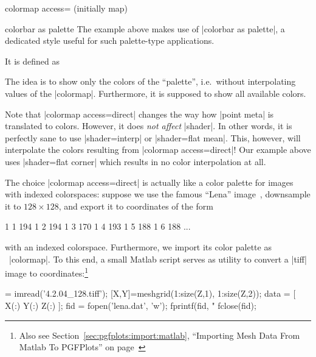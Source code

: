 \begin{pgfplotskey}{colormap access= (initially map)}
\begin{pgfplotskey}{colorbar as palette}
	The example above makes use of |colorbar as palette|, a dedicated style useful for such palette-type applications.

	It is defined as
\begin{codeexample}
\end{codeexample}
	The idea is to show only the colors of the ``palette'', i.e.\ without interpolating values of the |colormap|. Furthermore, it is supposed to show all available colors.
\end{pgfplotskey}

	Note that |colormap access=direct| changes the way how |point meta| is translated to colors. However, it does \emph{not affect} |shader|. In other words, it is perfectly sane to use |shader=interp| or |shader=flat mean|. This, however, will interpolate the colors resulting from |colormap access=direct|! Our example above uses |shader=flat corner| which results in no color interpolation at all.

	The choice |colormap access=direct| is actually like a color palette for images with indexed colorspaces: suppose we use the famous ``Lena'' image~\cite{lena}, downsample it to $128\times 128$, and export it to coordinates of the form
\begin{codeexample}
1 1 194
1 2 194
1 3 170
1 4 193
1 5 188
1 6 188
...
\end{codeexample}
	with an indexed colorspace. Furthermore, we import its color palette as \PGFPlots\ |colormap|. To this end, a small Matlab script serves as utility to convert a |tiff| image to coordinates:\footnote{Also see Section~\ref{sec:pgfplots:import:matlab}, ``Importing Mesh Data From Matlab To PGFPlots'' on page~\pageref{sec:pgfplots:import:matlab}}
\begin{codeexample} = imread('4.2.04_128.tiff');
[X,Y]=meshgrid(1:size(Z,1), 1:size(Z,2));
data = [ X(:) Y(:) Z(:) ];
fid = fopen('lena.dat', 'w');
fprintf(fid, "%
fclose(fid);


\end{codeexample}
\end{pgfplotskey}
